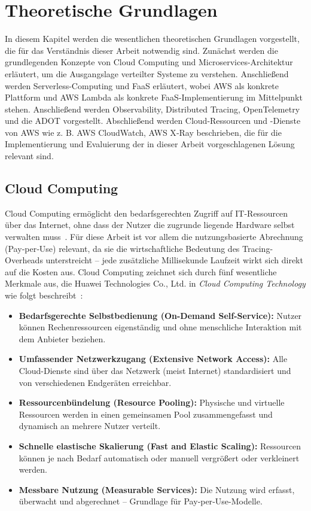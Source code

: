 ﻿\chapter{Theoretische Grundlagen}
\label{ch:chapter02}

In diesem Kapitel werden die wesentlichen theoretischen Grundlagen vorgestellt, die für das Verständnis dieser Arbeit notwendig sind. Zunächst werden die grundlegenden Konzepte von Cloud Computing und Microservices-Architektur erläutert, um die Ausgangslage verteilter Systeme zu verstehen. Anschließend werden Serverless-Computing und \ac{FaaS} erläutert, wobei \ac{AWS} als konkrete Plattform und \ac{AWS} Lambda als konkrete \ac{FaaS}-Implementierung im Mittelpunkt stehen. Anschließend werden Observability, Distributed Tracing, OpenTelemetry und die \ac{ADOT} vorgestellt. Abschließend werden Cloud-Ressourcen und -Dienste von \ac{AWS} wie z. B. \ac{AWS} CloudWatch, \ac{AWS} X‑Ray beschrieben, die für die Implementierung und Evaluierung der in dieser Arbeit vorgeschlagenen Lösung relevant sind.

\section{Cloud Computing}
\label{sec:cloud}

Cloud Computing ermöglicht den bedarfsgerechten Zugriff auf IT-Ressourcen über das Internet, ohne dass der Nutzer die zugrunde liegende Hardware selbst verwalten muss~\cite{Mell2011NIST}. Für diese Arbeit ist vor allem die nutzungsbasierte Abrechnung (Pay‑per‑Use) relevant, da sie die wirtschaftliche Bedeutung des Tracing-Overheads unterstreicht – jede zusätzliche Millisekunde Laufzeit wirkt sich direkt auf die Kosten aus.
Cloud Computing zeichnet sich durch fünf wesentliche Merkmale aus, die Huawei Technologies Co., Ltd. in \emph{Cloud Computing Technology} wie folgt beschreibt~\cite{Huawei2023CloudComputing}:
\begin{itemize}
    \item \textbf{Bedarfsgerechte Selbstbedienung (On-Demand Self-Service):} Nutzer können Rechenressourcen eigenständig und ohne menschliche Interaktion mit dem Anbieter beziehen.
    \item \textbf{Umfassender Netzwerkzugang (Extensive Network Access):} Alle Cloud-Dienste sind über das Netzwerk (meist Internet) standardisiert und von verschiedenen Endgeräten erreichbar.
    \item \textbf{Ressourcenbündelung (Resource Pooling):} Physische und virtuelle Ressourcen werden in einen gemeinsamen Pool zusammengefasst und dynamisch an mehrere Nutzer verteilt.
    \item \textbf{Schnelle elastische Skalierung (Fast and Elastic Scaling):} Ressourcen können je nach Bedarf automatisch oder manuell vergrößert oder verkleinert werden.
    \item \textbf{Messbare Nutzung (Measurable Services):} Die Nutzung wird erfasst, überwacht und abgerechnet – Grundlage für Pay‑per‑Use-Modelle.
\end{itemize}

